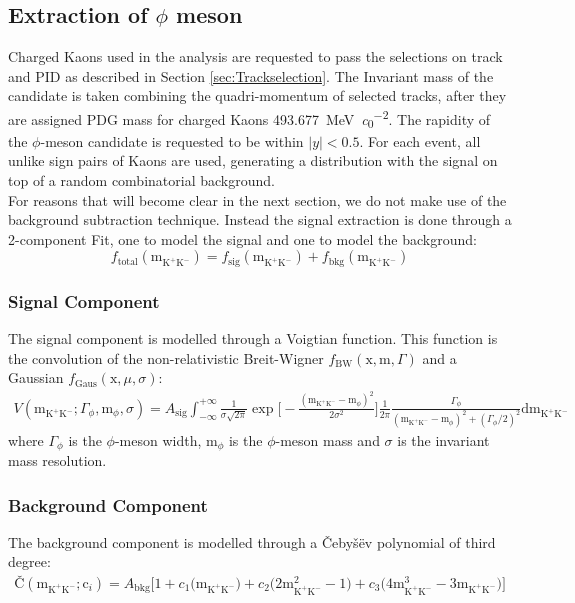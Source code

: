 \subsection{Extraction of $\phi$ meson}
Charged Kaons used in the analysis are requested to pass the selections on track and PID as described in Section \ref{sec:Trackselection}. The Invariant mass of the candidate is taken combining the quadri-momentum of selected tracks, after they are assigned PDG mass for charged Kaons \SI{493.677}{\mega\electronvolt\per\clight\squared}\cite{PDG}. The rapidity of the $\phi$-meson candidate is requested to be within $|y| < 0.5$. For each event, all unlike sign pairs of Kaons are used, generating a distribution with the signal on top of a random combinatorial background.\\
\indent For reasons that will become clear in the next section, we do not make use of the background subtraction technique. Instead the signal extraction is done through a 2-component Fit, one to model the signal and one to model the background:
\begin{equation}
f_{\text{total}}(\text{m}_{\text{K}^+\text{K}^-}) = f_{\text{sig}}(\text{m}_{\text{K}^+\text{K}^-}) + f_{\text{bkg}}(\text{m}_{\text{K}^+\text{K}^-})
\end{equation}
\subsubsection{Signal Component} The signal component is modelled through a Voigtian function. This function is the convolution of the non-relativistic Breit-Wigner $f_{\text{BW}}(\text{x},\text{m},\Gamma)$ and a Gaussian $f_{\text{Gaus}}(\text{x},\mu,\sigma)$:
\begin{eqnarray}
V(\text{m}_{\text{K}^+\text{K}^-};\Gamma_{\phi},\text{m}_{\phi},\sigma) = A_{\text{sig}}\int_{-\infty}^{+\infty}\frac{1}{\sigma\sqrt{2\pi}}\exp{\Big[ -\frac{(\text{m}_{\text{K}^+\text{K}^-}-\text{m}_{\phi})^2}{2\sigma^2} \Big]}\frac{1}{2\pi}\frac{\Gamma_{\phi}}{(\text{m}_{\text{K}^+\text{K}^-}-\text{m}_{\phi})^2+(\Gamma_{\phi}/2)^2}\text{d}\text{m}_{\text{K}^+\text{K}^-}
\end{eqnarray}
where $\Gamma_{\phi}$ is the $\phi$-meson width, $\text{m}_{\phi}$ is the $\phi$-meson mass and $\sigma$ is the invariant mass resolution.
\subsubsection{Background Component} The background component is modelled through a \v{C}eby\v{s}\"{e}v polynomial of third degree:
\begin{eqnarray}
\text{\v{C}}(\text{m}_{\text{K}^+\text{K}^-};\text{c}_i) = A_{\text{bkg}}\Big[1+ c_1\Big(\text{m}_{\text{K}^+\text{K}^-}\Big)+ c_2\Big(2\text{m}_{\text{K}^+\text{K}^-}^2-1\Big)+ c_3\Big(4\text{m}_{\text{K}^+\text{K}^-}^3-3\text{m}_{\text{K}^+\text{K}^-}\Big)\Big]
\end{eqnarray}

